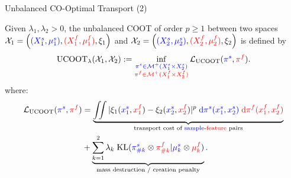 \documentclass{beamer}
\newcommand{\ucoot}{\text{UCOOT}}
\newcommand{\cX}{\mathcal X}
\newcommand{\cM}{\mathcal M}
\newcommand{\cL}{\mathcal L}
\newcommand{\pis}{{\color{blue}{\pi^s}}}
\newcommand{\pif}{{\color{red}{\pi^f}}}
\newcommand{\sfspace}{{\color{blue}{s.}}{\color{red}{f. }}}
\begin{document}
\begin{frame}{Unbalanced CO-Optimal Transport (2)}
\scriptsize
\vspace{-1cm}
\begin{definition}[UCOOT]
    Given $\lambda_1, \lambda_2 >0$, the unbalanced COOT of order $p \geq 1$
    between two \sfspace spaces $\cX_1 = \left({\color{blue}{(X_1^s, \mu_1^s)}}, {\color{red}{(X_1^f, \mu_1^f)}}, \xi_1 \right)$
    and $\cX_2 = \left({\color{blue}{(X_2^s, \mu_2^s)}}, {\color{red}{(X_2^f, \mu_2^f)}}, \xi_2 \right)$ is defined by
\begin{align*}
\label{eq:ucoot}
    \ucoot_{\lambda}(\cX_1, \cX_2) :=
  \inf_{\substack{{\color{blue}{\pi^s \in \cM^+(X_1^s \times X_2^s)}}
  \\ {\color{red}{\pi^f \in \cM^+(X_1^f \times X_2^f)}}}}
  \cL_{\ucoot}(\pis, \pif).
\end{align*}
\vspace{-0.8cm}
where:
\begin{align*}
    \cL_{\ucoot}(\pis, \pif) &= \underbrace{\iint
    |\xi_1({\color{blue}{x_1^s}}, {\color{red}{x_1^f}}) - \xi_2({\color{blue}{x_2^s}}, {\color{red}{x_2^f}})|^p \; {\color{blue}{\mathrm d\pi^s(x_1^s, x_2^s)}} \;
    {\color{red}{\mathrm d \pi^f(x_1^f, x_2^f)}}}_{\text{transport cost of {\color{blue}{sample}}-{\color{red}{feature}} pairs}} \\
    &+ \underbrace{\sum_{k=1}^2\lambda_k \; \text{KL}({\color{blue}{\pi^s_{\# k}}} \otimes {\color{red}{\pi^f_{\# k}}} \vert {\color{blue}{\mu^s_k}} \otimes {\color{red}{\mu^f_k}})}_{\text{mass destruction / creation penalty}}.
\end{align*}
\end{definition}


\end{frame}
\end{document}
